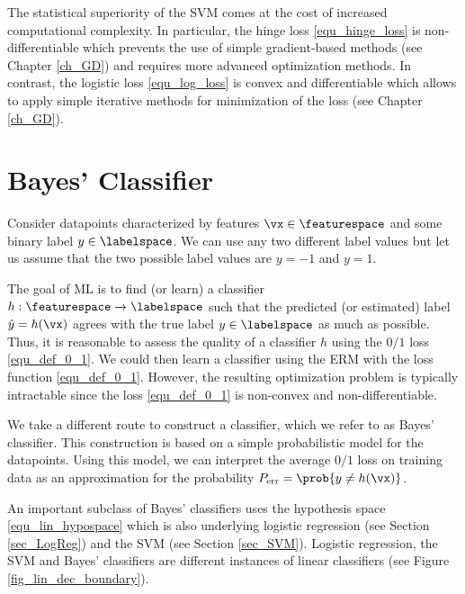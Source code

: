 \documentclass[12pt]{report}
\begin{document}
The statistical superiority of the SVM comes at the cost of increased 
computational complexity. In particular, the hinge loss \eqref{equ_hinge_loss} 
is non-differentiable which prevents the use of  simple gradient-based 
methods (see Chapter \ref{ch_GD}) and requires more advanced optimization 
methods. In contrast, the logistic loss \eqref{equ_log_loss} is convex and 
differentiable which allows to apply simple iterative methods for minimization 
of the loss (see Chapter \ref{ch_GD}). 


\section{Bayes' Classifier}
\label{sec_NaiveBayes}

Consider datapoints characterized by features $\vx \in \featurespace$ 
and some binary label $y \in \labelspace$. We can use any two different 
label values but let us assume that the two possible label values 
are $y=-1$ and $y=1$. 


The goal of ML is to find (or learn) a classifier $h: \featurespace \rightarrow \labelspace$ 
such that the predicted (or estimated) label $\hat{y} = h(\vx)$ agrees 
with the true label $y \in \labelspace$ as much as possible. Thus, it 
is reasonable to assess the quality of a classifier $h$ using the $0/1$ 
loss \eqref{equ_def_0_1}. We could then learn a classifier using the ERM 
with the loss function \eqref{equ_def_0_1}. However, the resulting 
optimization problem is typically intractable since the loss \eqref{equ_def_0_1} 
is non-convex and non-differentiable. 

We take a different route to construct a classifier, which we refer to 
as Bayes' classifier. This construction is based on a simple probabilistic 
model for the datapoints. Using this model, we can interpret the average 
$0/1$ loss on training data as an approximation for the probability 
$P_{\rm err} = \prob{ y \neq h(\vx) }$. 


An important subclass of Bayes' classifiers uses the hypothesis 
space \eqref{equ_lin_hypospace} which is also underlying logistic 
regression (see Section \ref{sec_LogReg}) and the SVM (see Section 
\ref{sec_SVM}). Logistic regression, the SVM and Bayes' 
classifiers are different instances of linear classifiers (see Figure \ref{fig_lin_dec_boundary}). 
\end{document}
